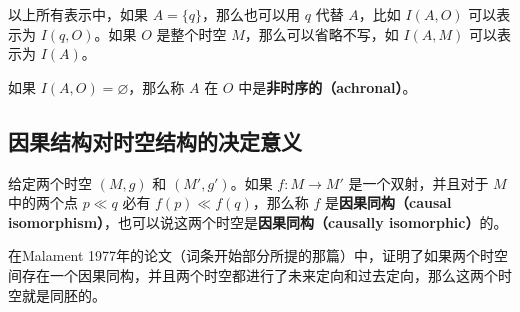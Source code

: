 以上所有表示中，如果 $A=\{q\}$，那么也可以用 $q$ 代替 $A$，比如 $I(A, O)$ 可以表示为 $I(q, O)$。如果 $O$ 是整个时空 $M$，那么可以省略不写，如 $I(A, M)$ 可以表示为 $I(A)$。

如果 $I(A, O)=\varnothing$，那么称 $A$ 在 $O$ 中是\textbf{非时序的（achronal）}。

\subsection{因果结构对时空结构的决定意义}

给定两个时空 $(M, g)$ 和 $(M', g')$。如果 $f:M\rightarrow M'$ 是一个双射，并且对于 $M$ 中的两个点 $p\ll q$ 必有 $f(p)\ll f(q)$，那么称 $f$ 是\textbf{因果同构（causal isomorphism）}，也可以说这两个时空是\textbf{因果同构（causally isomorphic）}的。

在Malament 1977年的论文（词条开始部分所提的那篇）中，证明了如果两个时空间存在一个因果同构，并且两个时空都进行了未来定向和过去定向，那么这两个时空就是同胚的。







